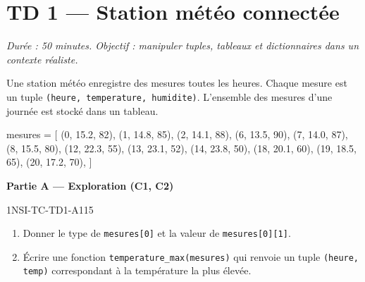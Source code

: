 \section*{TD 1 --- Station météo connectée}
\textit{Durée : 50 minutes. Objectif : manipuler tuples, tableaux et dictionnaires
dans un contexte réaliste.}

\bigskip

Une station météo enregistre des mesures toutes les heures. Chaque mesure est un
tuple \lstinline{(heure, temperature, humidite)}. L'ensemble des mesures d'une
journée est stocké dans un tableau.

\begin{python}
mesures = [
    (0, 15.2, 82), (1, 14.8, 85), (2, 14.1, 88),
    (6, 13.5, 90), (7, 14.0, 87), (8, 15.5, 80),
    (12, 22.3, 55), (13, 23.1, 52), (14, 23.8, 50),
    (18, 20.1, 60), (19, 18.5, 65), (20, 17.2, 70),
]
\end{python}

\textbf{Partie A --- Exploration (C1, C2)}

\begin{exercice}{1NSI-TC-TD1-A1}{1}{5}
\begin{enumerate}
  \item Donner le type de \lstinline{mesures[0]} et la valeur de
        \lstinline{mesures[0][1]}.
  \item Écrire une fonction \lstinline{temperature_max(mesures)}
        qui renvoie un tuple \lstinline{(heure, temp)}
        correspondant à la température la plus élevée.
\end{enumerate}
\end{exercice}


